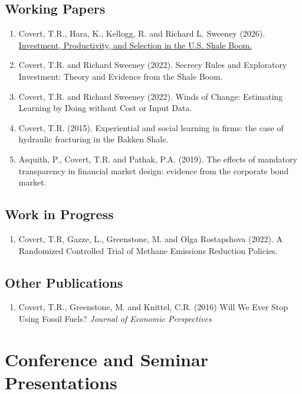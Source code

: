 \documentclass[10pt,letterpaper]{article}
\begin{document}
\subsection*{Working Papers}


\begin{enumerate}[resume]
\item Covert, T.R., Hara, K., Kellogg, R. and Richard L. Sweeney (2026).  \href{https://kelloggryan.com/Papers/chks_shaleprod_combined.pdf}{Investment, Productivity, and Selection in the U.S. Shale Boom.}
\item Covert, T.R. and Richard Sweeney (2022).  Secrecy Rules and Exploratory Investment: Theory and Evidence from the Shale Boom.
\item Covert, T.R. and Richard Sweeney (2022).  Winds of Change:  Estimating Learning by Doing without Cost or Input Data.
\item Covert, T.R. (2015). Experiential and social learning in firms: the case of hydraulic fracturing in the Bakken Shale.
\item Asquith, P., Covert, T.R. and Pathak, P.A. (2019).  The effects of mandatory transparency in financial market design: evidence from the corporate bond market.
\end{enumerate}


\subsection*{Work in Progress}
\begin{enumerate}[resume]
\item Covert, T.R, Gazze, L., Greenstone, M. and Olga Rostapshova (2022).  A Randomized Controlled Trial of Methane Emissions Reduction Policies.
\end{enumerate}




\subsection*{Other Publications}
\begin{enumerate}
    \item Covert, T.R., Greenstone, M. and Knittel, C.R. (2016) Will We Ever Stop Using Fossil Fuels? \textit{Journal of Economic Perspectives}
\end{enumerate}




\section*{Conference and Seminar Presentations}
\end{document}
